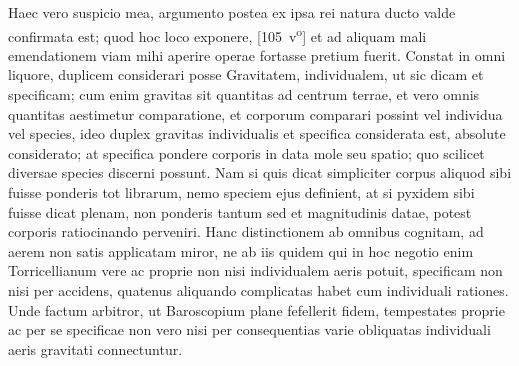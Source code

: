 \pstart  Haec vero suspicio mea, argumento  postea ex ipsa rei natura ducto valde  confirmata est; quod hoc loco exponere,
[105~v\textsuperscript{o}]  et ad aliquam mali emendationem viam  mihi aperire operae fortasse pretium fuerit.
\pend 
\pstart  Constat in omni liquore, duplicem  considerari posse Gravitatem\protect{}, individualem,  ut sic dicam et specificam; cum enim gravitas\protect{} sit quantitas   ad centrum terrae, et vero omnis quantitas  aestimetur comparatione, et corporum comparari  possint vel individua vel species, ideo duplex gravitas individualis\protect{} et specifica\protect{} considerata est,  absolute considerato;  at specifica pondere corporis in data mole  seu spatio; quo scilicet diversae species  discerni possunt. Nam si quis dicat simpliciter  corpus aliquod sibi fuisse ponderis tot librarum, nemo  speciem ejus definient, at si pyxidem sibi  fuisse dicat plenam, non  ponderis tantum sed et magnitudinis datae,  potest  corporis ratiocinando perveniri.
\pend
 \pstart  Hanc distinctionem ab omnibus cognitam, ad  aerem non satis applicatam miror, ne ab iis  quidem qui in hoc negotio   enim  Torricellianum vere ac proprie non  nisi individualem\protect{} aeris  potuit, specificam non nisi per accidens,  quatenus aliquando complicatas habet cum individuali rationes. Unde factum arbitror, ut Baroscopium\protect{}  plane fefellerit fidem,  tempestates proprie ac per se  specificae non vero nisi per consequentias  varie obliquatas individuali aeris gravitati\protect{}  connectuntur.
